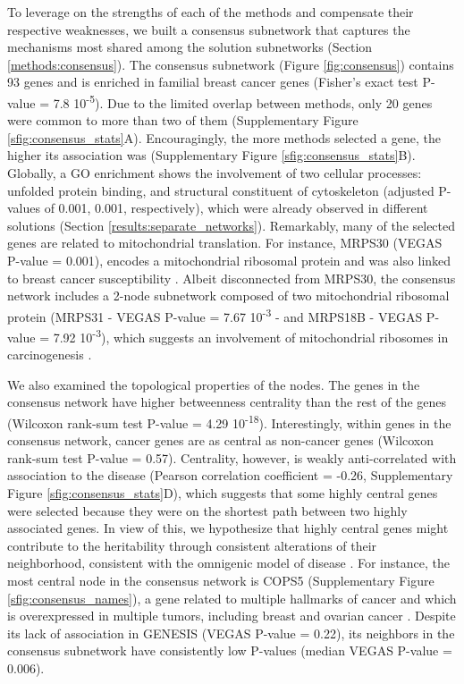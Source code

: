 \documentclass[twocolumn, 10pt]{article}
\begin{document}
To leverage on the strengths of each of the methods and compensate their respective weaknesses, we built a consensus subnetwork that captures the mechanisms most shared among the solution subnetworks (Section \ref{methods:consensus}). The consensus subnetwork (Figure \ref{fig:consensus}) contains 93 genes and is enriched in familial breast cancer genes (Fisher's exact test P-value = 7.8 \texttimes{} 10\textsuperscript{-5}). Due to the limited overlap between methods, only 20 genes were common to more than two of them (Supplementary Figure \ref{sfig:consensus_stats}A). Encouragingly, the more methods selected a gene, the higher its association was (Supplementary Figure \ref{sfig:consensus_stats}B). Globally, a GO enrichment shows the involvement of two cellular processes: unfolded protein binding, and structural constituent of cytoskeleton (adjusted P-values of 0.001, 0.001, respectively), which were already observed in different solutions (Section \ref{results:separate_networks}). Remarkably, many of the selected genes are related to mitochondrial translation. For instance, MRPS30 (VEGAS P-value = 0.001), encodes a mitochondrial ribosomal protein and was also linked to breast cancer susceptibility \cite{quigley_5p12_2014}. Albeit disconnected from MRPS30, the consensus network includes a 2-node subnetwork composed of two mitochondrial ribosomal protein (MRPS31 - VEGAS P-value = 7.67 \texttimes{} 10\textsuperscript{-3} - and MRPS18B - VEGAS P-value = 7.92 \texttimes{} 10\textsuperscript{-3}), which suggests an involvement of mitochondrial ribosomes in carcinogenesis \cite{required}.

We also examined the topological properties of the nodes. The genes in the consensus network have higher betweenness centrality than the rest of the genes (Wilcoxon rank-sum test P-value = 4.29 \texttimes{} 10\textsuperscript{-18}). Interestingly, within genes in the consensus network, cancer genes are as central as non-cancer genes (Wilcoxon rank-sum test P-value = 0.57). Centrality, however, is weakly anti-correlated with association to the disease (Pearson correlation coefficient = -0.26, Supplementary Figure \ref{sfig:consensus_stats}D), which suggests that some highly central genes were selected because they were on the shortest path between two highly associated genes. In view of this, we hypothesize that highly central genes might contribute to the heritability through consistent alterations of their neighborhood, consistent with the omnigenic model of disease \cite{boyle_expanded_2017}. For instance, the most central node in the consensus network is COPS5 (Supplementary Figure \ref{sfig:consensus_names}), a gene related to multiple hallmarks of cancer and which is overexpressed in multiple tumors, including breast and ovarian cancer \cite{liu_jab1_cops5_2018}. Despite its lack of association in GENESIS (VEGAS P-value = 0.22), its neighbors in the consensus subnetwork have consistently low P-values (median VEGAS P-value = 0.006).
\end{document}
